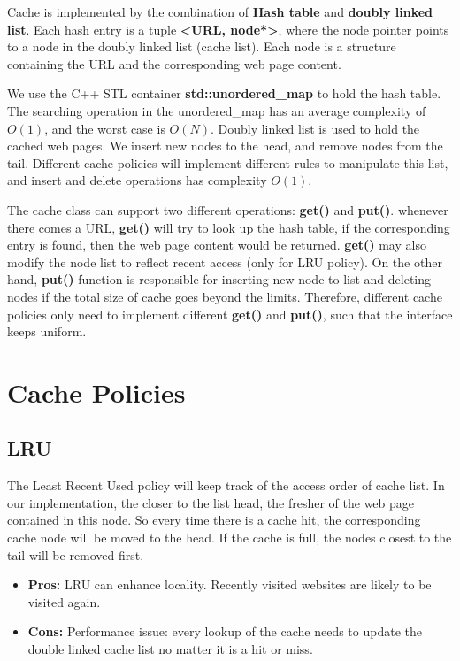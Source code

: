 \documentclass[paper=a4, fontsize=11pt]{scrartcl} %
\numberwithin{equation}{section} %
\numberwithin{figure}{section} %
\numberwithin{table}{section} %
\begin{document}
Cache is implemented by the combination of \textbf{Hash table} 
and \textbf{doubly linked list}. Each hash entry is 
a tuple \textbf{<URL, node*>}, where the node pointer points to a node
in the doubly linked list (cache list). Each node is a structure
containing the URL and the corresponding web page content.

\vspace{0.5em}

We use the C++ STL container \textbf{std::unordered\_map} to hold the 
hash table. The searching operation in the unordered\_map
has an average complexity of $O(1)$, and the worst case is $O(N)$. Doubly
linked list is used to hold the cached web pages. We insert new nodes
to the head, and remove nodes from the tail. Different cache policies will
implement different rules to manipulate this list, and insert and
delete operations has complexity $O(1)$.

\vspace{0.5em}

The cache class can support two different operations: \textbf{get()} and
\textbf{put()}. whenever there comes a URL, \textbf{get()} will try to look
up the hash table, if the corresponding entry is found, then the web page
content would be returned. 
\textbf{get()} may also modify the node list to reflect recent access
(only for LRU policy). On the other hand, \textbf{put()} function is
responsible for inserting new node to list and deleting nodes if the
total size of cache goes beyond the limits. Therefore, different cache 
policies only need to implement different \textbf{get()} and 
\textbf{put()}, 
such that the interface keeps uniform.

\section{Cache Policies}

\subsection{LRU}
The Least Recent Used policy will keep track of the access order 
of cache list. In our implementation, the closer to the list head, 
the fresher of the web page contained in this node. So every time 
there is a cache hit, the corresponding cache node will be moved to
the head. If the cache is full, the nodes closest to the tail will
be removed first.
\begin{itemize}
\item \textbf{Pros:} LRU can enhance locality. Recently visited websites
are likely to be visited again.
\item \textbf{Cons:} Performance issue: every lookup of the cache needs
to update the double linked cache list no matter it is a hit or
miss.
\end{itemize}
\end{document}
